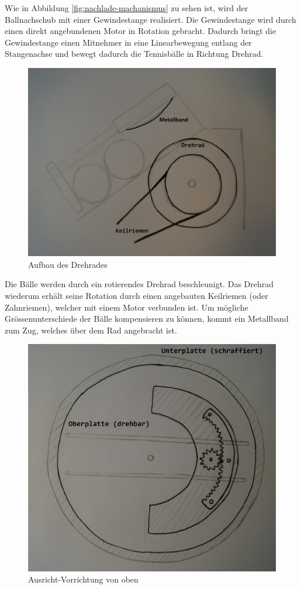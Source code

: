 Wie in Abbildung \ref{fig:nachlade-machanismus} zu sehen ist, wird der Ballnachschub mit einer Gewindestange realisiert. Die Gewindestange wird durch einen direkt angebundenen Motor in Rotation gebracht. Dadurch bringt die Gewindestange einen Mitnehmer in eine Linearbewegung entlang der Stangenachse und bewegt dadurch die Tennisbälle in Richtung Drehrad.

\begin{figure}[h!]
	\centering
	\includegraphics[scale=0.35]{../../fig/Drehrad.jpg}
	\caption{Aufbau des Drehrades}
\end{figure}

Die Bälle werden durch ein rotierendes Drehrad beschleunigt. Das Drehrad wiederum erhält seine Rotation durch einen angebauten Keilriemen (oder Zahnriemen), welcher mit einem Motor verbunden ist. Um mögliche Grössenunterschiede der Bälle kompensieren zu können, kommt ein Metallband zum Zug, welches über dem Rad angebracht ist.

\newpage

\begin{figure}[h!]
	\centering
	\includegraphics[scale=0.35]{../../fig/Ausrichtvorrichtung_Oben.jpg}
	\caption{Ausricht-Vorrichtung von oben}
\end{figure}

